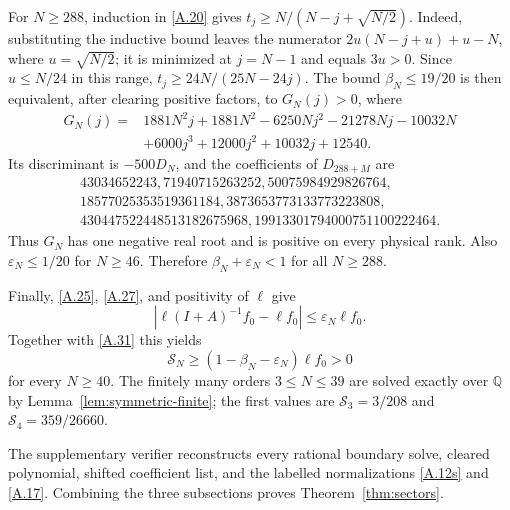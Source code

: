 For $N\ge288$, induction in \eqref{A.20} gives
$t_j\ge N/(N-j+\sqrt{N/2})$.  Indeed, substituting the inductive bound leaves
the numerator
$2u(N-j+u)+u-N$, where $u=\sqrt{N/2}$; it is minimized at $j=N-1$ and
equals $3u>0$.  Since $u\le N/24$ in this range,
$t_j\ge24N/(25N-24j)$.  The bound
$\beta_N\le19/20$ is then equivalent, after clearing positive factors, to
$G_N(j)>0$, where
\[
\begin{aligned}
G_N(j)={}&1881N^2j+1881N^2-6250Nj^2-21278Nj-10032N\\
         &+6000j^3+12000j^2+10032j+12540.
\end{aligned}                                               \tag{A.34}\label{A.34}
\]
Its discriminant is $-500D_N$, and the coefficients of $D_{288+M}$ are
\[
\begin{gathered}
43034652243,71940715263252,50075984929826764,\\
18577025353519361184,3873653773133773223808,\\
430447522448513182675968,
19913301794000751100222464.
\end{gathered}                                             \tag{A.35}\label{A.35}
\]
Thus $G_N$ has one negative real root and is positive on every physical
rank.  Also $\varepsilon_N\le1/20$ for $N\ge46$.  Therefore
$\beta_N+\varepsilon_N<1$ for all $N\ge288$.

Finally, \eqref{A.25}, \eqref{A.27}, and positivity of $\ell$ give
\[
 \left|\ell(I+A)^{-1}f_0-\ell f_0\right|
 \le\varepsilon_N\ell f_0.
\]
Together with \eqref{A.31} this yields
\[
 \mathcal S_N\ge(1-\beta_N-\varepsilon_N)\ell f_0>0       \tag{A.36}\label{A.36}
\]
for every $N\ge40$.  The finitely many orders $3\le N\le39$ are solved
exactly over $\mathbb Q$ by Lemma~\ref{lem:symmetric-finite}; the first values are
$\mathcal S_3=3/208$ and $\mathcal S_4=359/26660$.

The supplementary verifier reconstructs every rational boundary solve,
cleared polynomial, shifted coefficient list, and the labelled
normalizations \eqref{A.12s} and \eqref{A.17}.  Combining the three
subsections proves Theorem~\ref{thm:sectors}.
